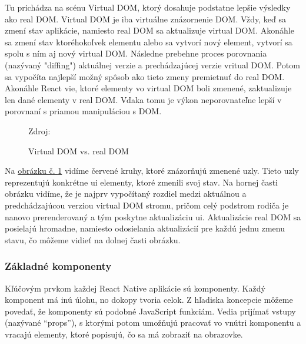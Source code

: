 Tu prichádza na scénu Virtual DOM, ktorý dosahuje podstatne lepšie výsledky ako real DOM. Virtual DOM je iba virtuálne znázornenie DOM. Vždy, keď sa zmení stav aplikácie, namiesto real DOM sa aktualizuje virtual DOM. Akonáhle sa zmení stav ktoréhokoľvek elementu alebo sa vytvorí nový element, vytvorí sa spolu s ním aj nový virtual DOM. Následne prebehne proces porovnania (nazývaný "diffing") aktuálnej verzie a prechádzajúcej verzie vritual DOM. Potom sa vypočíta najlepší možný spôsob ako tieto zmeny premietnuť do real DOM. Akonáhle React vie, ktoré elementy vo virtual DOM boli zmenené, zaktualizuje len dané elementy v real DOM. Vďaka tomu je výkon neporovnateľne lepší v porovnaní s priamou manipuláciou s DOM. \cite{rn4}

\begin{figure}[!htbp]
  \centering  
  \def\stackalignment{c}
           {\scriptsize%
            Zdroj: \cite{oreily}}
	\caption{Virtual DOM vs. real DOM}  
  \label{domImg}
\end{figure}
Na \hyperref[domImg]{obrázku č. \ref{domImg}} vidíme červené kruhy, ktoré znázorňujú zmenené uzly. Tieto uzly reprezentujú konkrétne \acrshort{ui} elementy, ktoré zmenili svoj stav. Na hornej časti obrázku vidíme, že je najprv vypočítaný rozdiel medzi aktuálnou a predchádzajúcou verziou virtual DOM stromu, pričom celý podstrom rodiča je nanovo prerenderovaný a tým poskytne aktualizáciu \acrshort{ui}. Aktualizácie real DOM sa posielajú hromadne, namiesto odosielania aktualizácií pre každú jednu zmenu stavu, čo môžeme vidieť na dolnej časti obrázku. \\

\subsubsection{Základné komponenty}
Kľúčovým prvkom každej React Native aplikácie sú komponenty. Každý komponent má inú úlohu, no dokopy tvoria celok. Z hľadiska koncepcie môžeme povedať, že komponenty sú podobné JavaScript funkciám. Vedia prijímať vstupy (nazývané ``props''), s ktorými potom umožňujú pracovať vo vnútri komponentu a vracajú elementy, ktoré popisujú, čo sa má zobraziť na obrazovke. \cite{react}

